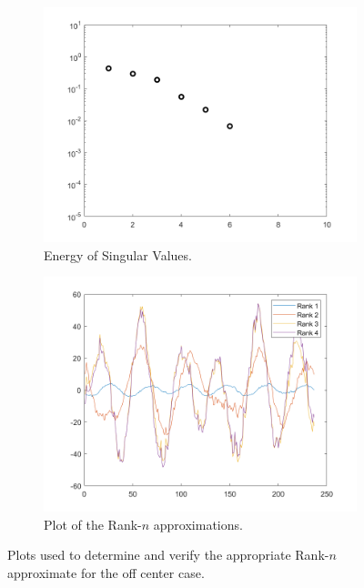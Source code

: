 \documentclass[12pt]{article}%
\begin{document}
\begin{figure}
    \begin{subfigure}[b]{0.5\linewidth}
      \centering
      \includegraphics[width=\linewidth]{3-energy.png}
      \caption{Energy of Singular Values.}
      \label{fig3:a}
      \vspace{4ex}
    \end{subfigure}%
    \begin{subfigure}[b]{0.5\linewidth}
      \centering
      \includegraphics[width=\linewidth]{3-aprox.png}
      \caption{Plot of the Rank-$n$ approximations.}
      \label{fig3:b}
      \vspace{4ex}
    \end{subfigure}
    \caption{Plots used to determine and verify the appropriate Rank-$n$ approximate for the off center case.}
    \label{fig3}
\end{figure}
\end{document}
